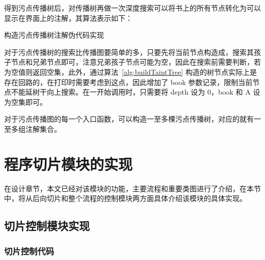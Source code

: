 得到污点传播树后，对传播树再做一次深度搜索可以将书上的所有节点转化为可以显示在界面上的注解，其算法表示如下：

\begin{algorithm}[!htb]\footnotesize
    \caption{构造污点传播树注解伪代码实现}
    \label{alg:buildAnnotation}
\end{algorithm}

对于污点传播树的搜索比传播图要简单的多，只要先将当前节点构造成，搜索其孩子节点和兄弟节点即可，注意兄弟孩子节点可能为空，因此在搜索前需要判断，若为空值则返回空集，此外，通过算法~\ref{alg:buildTaintTree} 构造的树节点实际上是存在回路的，在打印时需要考虑到这点，因此增加了 book 参数记录，限制当前节点不能延树干向上搜索。在一开始调用时，只需要将 depth 设为 0，book 和 A 设为空集即可。

对于污点传播图的每一个入口函数，可以构造一至多棵污点传播树，对应的就有一至多组注解集合。

\section{程序切片模块的实现}
在设计章节，本文已经对该模块的功能，主要流程和重要类图进行了介绍，在本节中，将从后向切片和整个流程的控制模块两方面具体介绍该模块的具体实现。\\

\subsection{切片控制模块实现}

\subsubsection{切片控制代码}

